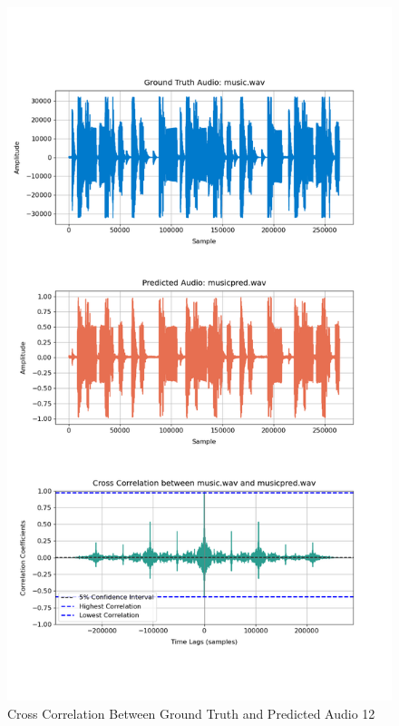 \documentclass{ioereport}
\begin{document}
    \begin{figure}[H]
        \centering
        \includegraphics[width=\linewidth]{assets/crosscorrelation/cross_correlation_music_musicpred.png}
        \caption{Cross Correlation Between Ground Truth and Predicted Audio 12}
        \label{fig:cross-correlation-12}
    \end{figure}
\end{document}
